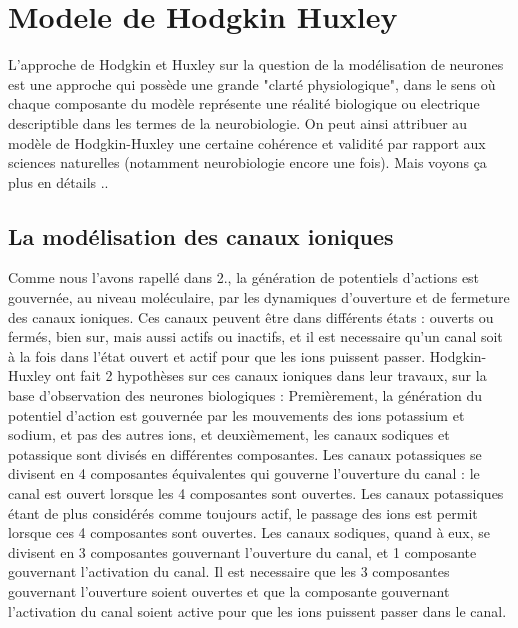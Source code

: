 \documentclass[12pt]{scrartcl}
\begin{document}
\section{Modele de Hodgkin Huxley}\label{hh}
	L'approche de Hodgkin et Huxley sur la question de la modélisation de neurones est une approche qui possède une grande "clarté physiologique", dans le sens où chaque composante du modèle représente une réalité biologique ou electrique descriptible dans les termes de la neurobiologie. On peut ainsi attribuer au modèle de Hodgkin-Huxley une certaine cohérence et validité par rapport aux sciences naturelles (notamment neurobiologie encore une fois). Mais voyons ça plus en détails ..
	
	\subsection{La modélisation des canaux ioniques}
		Comme nous l'avons rapellé dans 2., la génération de potentiels d'actions est gouvernée, au niveau moléculaire, par les dynamiques d'ouverture et de fermeture des canaux ioniques. Ces canaux peuvent être dans différents états : ouverts ou fermés, bien sur, mais aussi actifs ou inactifs, et il est necessaire qu'un canal soit à la fois dans l'état ouvert et actif pour que les ions puissent passer. Hodgkin-Huxley ont fait 2 hypothèses sur ces canaux ioniques dans leur travaux, sur la base d'observation des neurones biologiques : Premièrement, la génération du potentiel d'action est gouvernée par les mouvements des ions potassium et sodium, et pas des autres ions, et deuxièmement, les canaux sodiques et potassique sont divisés en différentes composantes. Les canaux potassiques se divisent en 4 composantes équivalentes qui gouverne l'ouverture du canal : le canal est ouvert lorsque les 4 composantes sont ouvertes. Les canaux potassiques étant de plus considérés comme toujours actif, le passage des ions est permit lorsque ces 4 composantes sont ouvertes. Les canaux sodiques, quand à eux, se divisent en 3 composantes gouvernant l'ouverture du canal, et 1 composante gouvernant l'activation du canal. Il est necessaire que les 3 composantes gouvernant l'ouverture soient ouvertes et que la composante gouvernant l'activation du canal soient active pour que les ions puissent passer dans le canal.
\end{document}
